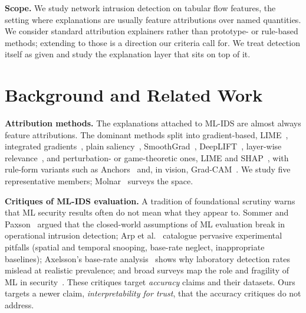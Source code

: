\documentclass[conference]{IEEEtran}
\begin{document}
\textbf{Scope.} We study network intrusion detection on tabular flow features, the setting where
explanations are usually feature attributions over named quantities. We consider standard
attribution explainers rather than prototype- or rule-based methods; extending to those is a
direction our criteria call for. We treat detection itself as given and study the explanation
layer that sits on top of it.

\section{Background and Related Work}\label{sec:bg}
\textbf{Attribution methods.} The explanations attached to ML-IDS are almost always feature
attributions. The dominant methods split into gradient-based, LIME~\cite{ribeiro2016lime},
integrated gradients~\cite{sundararajan2017ig}, plain saliency~\cite{simonyan2013saliency},
SmoothGrad~\cite{smilkov2017smoothgrad}, DeepLIFT~\cite{shrikumar2017deeplift}, layer-wise
relevance~\cite{bach2015lrp}, and perturbation- or game-theoretic ones, LIME and
SHAP~\cite{lundberg2017shap}, with rule-form variants such as Anchors~\cite{ribeiro2018anchors}
and, in vision, Grad-CAM~\cite{selvaraju2017gradcam}. We study five representative members;
Molnar~\cite{molnar2022interpretable} surveys the space.

\textbf{Critiques of ML-IDS evaluation.} A tradition of foundational scrutiny warns that ML
security results often do not mean what they appear to. Sommer and Paxson~\cite{sommer2010}
argued that the closed-world assumptions of ML evaluation break in operational intrusion
detection; Arp et al.~\cite{arp2022} catalogue pervasive experimental pitfalls (spatial and
temporal snooping, base-rate neglect, inappropriate baselines); Axelsson's base-rate
analysis~\cite{axelsson2000} shows why laboratory detection rates mislead at realistic
prevalence; and broad surveys map the role and fragility of ML in
security~\cite{apruzzese2023role,mahdavifar2019application}. These critiques target
\emph{accuracy} claims and their datasets. Ours targets a newer claim, \emph{interpretability for
trust}, that the accuracy critiques do not address.
\end{document}
